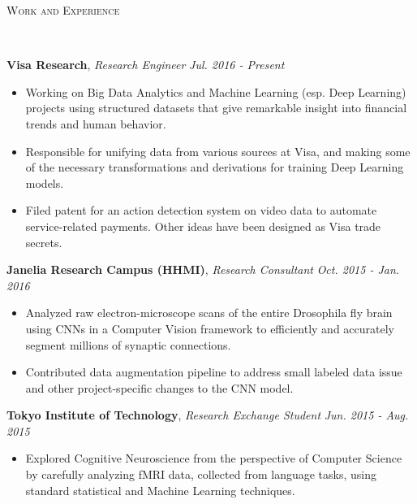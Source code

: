 \documentclass[9pt]{article}
\newenvironment{changemargin}[2]{%
  \begin{list}{}{%
    \setlength{\topsep}{0pt}%
    \setlength{\leftmargin}{#1}%
    \setlength{\rightmargin}{#2}%
    \setlength{\listparindent}{\parindent}%
    \setlength{\itemindent}{\parindent}%
    \setlength{\parsep}{\parskip}%
  }%
  \item[]}{\end{list}
}
\newcommand{\lineover}{
	\begin{changemargin}{-0.05in}{-0.05in}
		\vspace*{-8pt}
		\hrulefill \\
		\vspace*{-2pt}
	\end{changemargin}
}
\newcommand{\header}[1]{
	\begin{changemargin}{-0.5in}{-0.5in}
		\scshape{#1}\\
  	\lineover
	\end{changemargin}
}
\newenvironment{body} {
	\vspace*{-16pt}
	\begin{changemargin}{-0.25in}{-0.5in}
  }	
	{\end{changemargin}
}
\begin{document}
\header{Work and Experience}
\begin{body}
	\vspace{14pt}
	\textbf{Visa Research}, \emph{Research Engineer} \hfill \emph{Jul. 2016 - Present}\\
	\vspace*{-3pt}
	\begin{itemize} \itemsep -0pt %
	\item Working on Big Data Analytics and Machine Learning (esp. Deep Learning) projects using structured datasets that give remarkable insight into financial trends and human behavior.
	\item Responsible for unifying data from various sources at Visa, and making some of the necessary transformations and derivations for training Deep Learning models.
    \item Filed patent for an action detection system on video data to automate service-related payments. Other ideas have been designed as Visa trade secrets.
	\end{itemize}
	\vspace*{-2pt}
	\textbf{Janelia Research Campus (HHMI)}, \emph{Research Consultant} \hfill \emph{Oct. 2015 - Jan. 2016}\\
	\vspace*{-3pt}
	\begin{itemize} \itemsep -0pt %
	\item Analyzed raw electron-microscope scans of the entire Drosophila fly brain using CNNs in a Computer Vision framework to efficiently and accurately segment millions of synaptic connections.
	\item Contributed data augmentation pipeline to address small labeled data issue and other project-specific changes to the CNN model.
	\end{itemize}
	\vspace*{-2pt}
	\textbf{Tokyo Institute of Technology}, \emph{Research Exchange Student} \hfill \emph{Jun. 2015 - Aug. 2015}\\
	\vspace*{-3pt}
	\begin{itemize} \itemsep -0pt %
	\item Explored Cognitive Neuroscience from the perspective of Computer Science by carefully analyzing fMRI data, collected from language tasks, using standard statistical and Machine Learning techniques.

\end{itemize}
\end{body}
\end{document}

